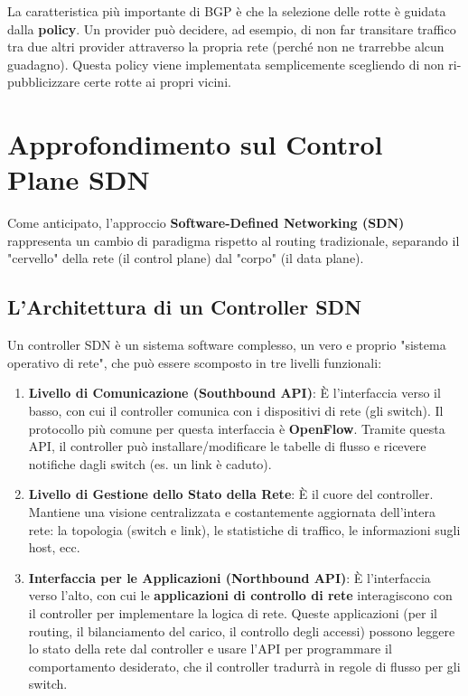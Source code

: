La caratteristica più importante di BGP è che la selezione delle rotte è guidata dalla \textbf{policy}. Un provider può decidere, ad esempio, di non far transitare traffico tra due altri provider attraverso la propria rete (perché non ne trarrebbe alcun guadagno). Questa policy viene implementata semplicemente scegliendo di non ri-pubblicizzare certe rotte ai propri vicini.


\section{Approfondimento sul Control Plane SDN}
Come anticipato, l'approccio \textbf{Software-Defined Networking (SDN)} rappresenta un cambio di paradigma rispetto al routing tradizionale, separando il "cervello" della rete (il control plane) dal "corpo" (il data plane).

\subsection{L'Architettura di un Controller SDN}
Un controller SDN è un sistema software complesso, un vero e proprio "sistema operativo di rete", che può essere scomposto in tre livelli funzionali:
\begin{enumerate}
    \item \textbf{Livello di Comunicazione (Southbound API)}: È l'interfaccia verso il basso, con cui il controller comunica con i dispositivi di rete (gli switch). Il protocollo più comune per questa interfaccia è \textbf{OpenFlow}. Tramite questa API, il controller può installare/modificare le tabelle di flusso e ricevere notifiche dagli switch (es. un link è caduto).
    \item \textbf{Livello di Gestione dello Stato della Rete}: È il cuore del controller. Mantiene una visione centralizzata e costantemente aggiornata dell'intera rete: la topologia (switch e link), le statistiche di traffico, le informazioni sugli host, ecc.
    \item \textbf{Interfaccia per le Applicazioni (Northbound API)}: È l'interfaccia verso l'alto, con cui le \textbf{applicazioni di controllo di rete} interagiscono con il controller per implementare la logica di rete. Queste applicazioni (per il routing, il bilanciamento del carico, il controllo degli accessi) possono leggere lo stato della rete dal controller e usare l'API per programmare il comportamento desiderato, che il controller tradurrà in regole di flusso per gli switch.
\end{enumerate}

